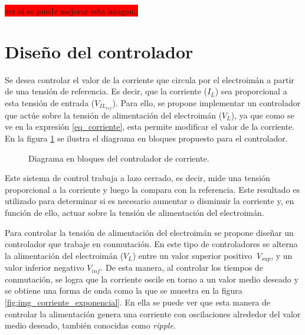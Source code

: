 \colorbox{red}{ver si se puede mejorar esta imagen..}

\section{Diseño del controlador}

Se desea controlar el valor de la corriente que circula por el electroimán a partir de una tensión de referencia. Es decir, que la corriente ($I_L$) sea proporcional a esta tensión de entrada ($V_{IL_{ref}}$). Para ello, se propone implementar un controlador que actúe sobre la tensión de alimentación del electroimán ($V_L$), ya que como se ve en la expresión \ref{eq_corriente}, esta permite modificar el valor de la corriente. En la figura \ref{fig:img_diagrama_bloques_basico_cc} se ilustra el diagrama en bloques propuesto para el controlador.


\begin{figure}[H]
	\centering
	
	\caption{Diagrama en bloques del controlador de corriente.}
	\label{fig:img_diagrama_bloques_basico_cc}
\end{figure}

Este sistema de control trabaja a lazo cerrado, es decir, mide una tensión proporcional a la corriente y luego la compara con la referencia. Este resultado es utilizado para determinar si es necesario aumentar o disminuir la corriente y, en función de ello, actuar sobre la tensión de alimentación del electroimán.

Para controlar la tensión de alimentación del electroimán se propone diseñar un controlador que trabaje en conmutación. En este tipo de controladores se alterna la alimentación del electroimán ($V_L$) entre un valor superior positivo $\ V_{sup}$, y un valor inferior negativo $V_{inf}$. De esta manera, al controlar los tiempos de conmutación, se logra que la corriente oscile en torno a un valor medio deseado y se obtiene una forma de onda como la que se muestra en la figura  \ref{fig:img_corriente_exponencial}. En ella se puede ver que esta manera de controlar la alimentación genera una corriente con oscilaciones alrededor del valor medio deseado, también conocidas como \textsl{ripple}. 

